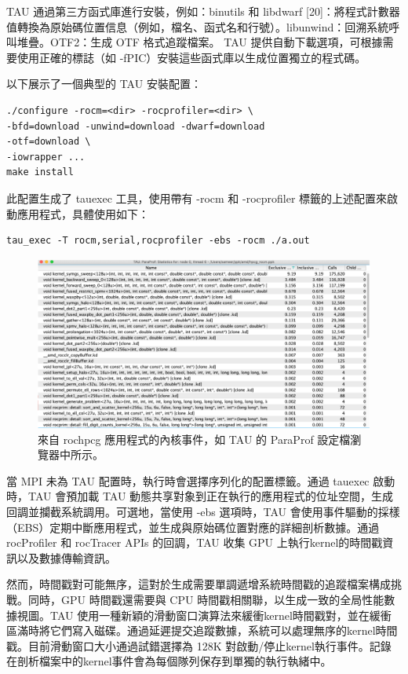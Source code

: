 TAU 通過第三方函式庫進行安裝，例如：binutils 和 libdwarf [20]：將程式計數器值轉換為原始碼位置信息（例如，檔名、函式名和行號）。libunwind：回溯系統呼叫堆疊。OTF2：生成 OTF 格式追蹤檔案。
TAU 提供自動下載選項，可根據需要使用正確的標誌（如 -fPIC）安裝這些函式庫以生成位置獨立的程式碼。

以下展示了一個典型的 TAU 安裝配置：
\begin{lstlisting}
.∕configure -rocm=<dir> -rocprofiler=<dir> \
-bfd=download -unwind=download -dwarf=download
-otf=download \
-iowrapper ...
make install
\end{lstlisting}

此配置生成了 tauexec 工具，使用帶有 -rocm 和 -rocprofiler 標籤的上述配置來啟動應用程式，具體使用如下：

\begin{lstlisting}
tau_exec -T rocm,serial,rocprofiler -ebs -rocm .∕a.out
\end{lstlisting}


\begin{figure}
    \centering
    \includegraphics[width=0.9\linewidth]{FileAusiliari/Screenshots/Figure13-17.png}
    \caption{來自 rochpcg 應用程式的內核事件，如 TAU 的 ParaProf 設定檔瀏覽器中所示。}
    \label{fig:PAPI17}
\end{figure}

當 MPI 未為 TAU 配置時，執行時會選擇序列化的配置標籤。通過 tauexec 啟動時，TAU 會預加載 TAU 動態共享對象到正在執行的應用程式的位址空間，生成回調並攔截系統調用。可選地，當使用 -ebs 選項時，TAU 會使用事件驅動的採樣（EBS）定期中斷應用程式，並生成與原始碼位置對應的詳細剖析數據。通過 rocProfiler 和 rocTracer APIs 的回調，TAU 收集 GPU 上執行kernel的時間戳資訊以及數據傳輸資訊。

然而，時間戳對可能無序，這對於生成需要單調遞增系統時間戳的追蹤檔案構成挑戰。同時，GPU 時間戳還需要與 CPU 時間戳相關聯，以生成一致的全局性能數據視圖。TAU 使用一種新穎的滑動窗口演算法來緩衝kernel時間戳對，並在緩衝區滿時將它們寫入磁碟。通過延遲提交追蹤數據，系統可以處理無序的kernel時間戳。目前滑動窗口大小通過試錯選擇為 128K 對啟動/停止kernel執行事件。記錄在剖析檔案中的kernel事件會為每個隊列保存到單獨的執行執緒中。

